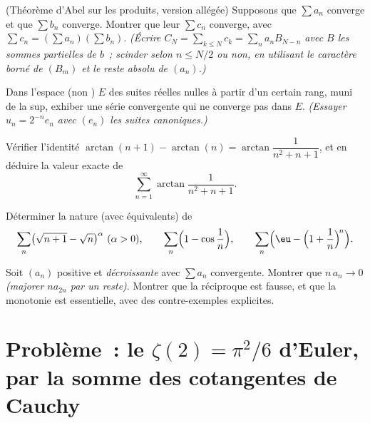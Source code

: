 \begin{exercise}[$\star\star\star$]\label{exo:b2:series:8}
(Théorème d'Abel sur les produits, version allégée) Supposons que
$\sum a_n$ converge  et que $\sum b_n$ converge. Montrer
que leur  $\sum c_n$ converge, avec $\sum c_n =
(\sum a_n)(\sum b_n)$. \emph{(Écrire $C_N = \sum_{k\leq N} c_k =
\sum_n a_n B_{N-n}$ avec $B$ les sommes partielles de $b$~; scinder
selon $n \leq N/2$ ou non, en utilisant le caractère borné de $(B_m)$
et le reste absolu de $(a_n)$.)}
\end{exercise}

\begin{exercise}[$\star\star\star$]\label{exo:b2:series:9}
Dans l'espace (non ) $E$ des suites réelles nulles à partir
d'un certain rang, muni de la  sup, exhiber une série 
convergente qui ne converge pas dans $E$. \emph{(Essayer $u_n = 2^{-n}
e_n$ avec $(e_n)$ les suites canoniques.)}
\end{exercise}

\begin{exercise}[$\star\star$]\label{exo:b2:series:10}
Vérifier l'identité $\arctan(n+1) - \arctan(n) =
\arctan\dfrac{1}{n^2 + n + 1}$, et en déduire la valeur exacte de
\[
\sum_{n=1}^{\infty} \arctan\frac{1}{n^2 + n + 1} .
\]
\end{exercise}

\begin{exercise}[$\star\star$]\label{exo:b2:series:11}
Déterminer la nature (avec équivalents) de
\[
\sum_n \bigl(\sqrt{n+1} - \sqrt n\bigr)^{\alpha}
\ (\alpha > 0), \qquad
\sum_n \Bigl(1 - \cos\frac1n\Bigr), \qquad
\sum_n \Bigl(\eu - \Bigl(1 + \frac1n\Bigr)^{\!n}\Bigr).
\]
\end{exercise}

\begin{exercise}[$\star\star\star$]\label{exo:b2:series:12}
Soit $(a_n)$ positive et \emph{décroissante} avec $\sum a_n$
convergente. Montrer que $n\,a_n \to 0$ \emph{(majorer $n a_{2n}$ par
un reste)}. Montrer que la réciproque est fausse, et que la monotonie
est essentielle, avec des contre-exemples explicites.
\end{exercise}

\section{Problème~: le $\zeta(2) = \pi^2/6$ d'Euler, par la somme
des cotangentes de Cauchy}

